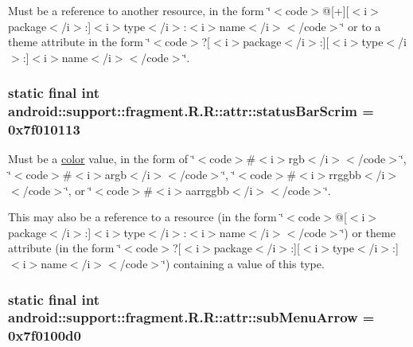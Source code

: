 Must be a reference to another resource, in the form \char`\"{}$<$code$>$@\mbox{[}+\mbox{]}\mbox{[}$<$i$>$package$<$/i$>$:\mbox{]}$<$i$>$type$<$/i$>$:$<$i$>$name$<$/i$>$$<$/code$>$\char`\"{} or to a theme attribute in the form \char`\"{}$<$code$>$?\mbox{[}$<$i$>$package$<$/i$>$:\mbox{]}\mbox{[}$<$i$>$type$<$/i$>$:\mbox{]}$<$i$>$name$<$/i$>$$<$/code$>$\char`\"{}. \hypertarget{classandroid_1_1support_1_1fragment_1_1_r_1_1attr_efad4d840213df58f513502ac04317e3}{
\subsubsection[{statusBarScrim}]{\setlength{\rightskip}{0pt plus 5cm}static final int android::support::fragment.R.R::attr::statusBarScrim = 0x7f010113}}
\label{classandroid_1_1support_1_1fragment_1_1_r_1_1attr_efad4d840213df58f513502ac04317e3}


Must be a \hyperlink{classandroid_1_1support_1_1fragment_1_1_r_1_1color}{color} value, in the form of \char`\"{}$<$code$>$\#$<$i$>$rgb$<$/i$>$$<$/code$>$\char`\"{}, \char`\"{}$<$code$>$\#$<$i$>$argb$<$/i$>$$<$/code$>$\char`\"{}, \char`\"{}$<$code$>$\#$<$i$>$rrggbb$<$/i$>$$<$/code$>$\char`\"{}, or \char`\"{}$<$code$>$\#$<$i$>$aarrggbb$<$/i$>$$<$/code$>$\char`\"{}. 

This may also be a reference to a resource (in the form \char`\"{}$<$code$>$@\mbox{[}$<$i$>$package$<$/i$>$:\mbox{]}$<$i$>$type$<$/i$>$:$<$i$>$name$<$/i$>$$<$/code$>$\char`\"{}) or theme attribute (in the form \char`\"{}$<$code$>$?\mbox{[}$<$i$>$package$<$/i$>$:\mbox{]}\mbox{[}$<$i$>$type$<$/i$>$:\mbox{]}$<$i$>$name$<$/i$>$$<$/code$>$\char`\"{}) containing a value of this type. \hypertarget{classandroid_1_1support_1_1fragment_1_1_r_1_1attr_94dafe37b8529d08944f0778d0d59eda}{
\subsubsection[{subMenuArrow}]{\setlength{\rightskip}{0pt plus 5cm}static final int android::support::fragment.R.R::attr::subMenuArrow = 0x7f0100d0}}
\label{classandroid_1_1support_1_1fragment_1_1_r_1_1attr_94dafe37b8529d08944f0778d0d59eda}


